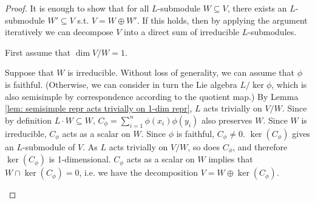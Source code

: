 \documentclass{article}
\begin{document}
\begin{proof}
    It is enough to show that for all $L$-submodule $W \subseteq V$, there exists an $L$-submodule $W' \subseteq V$ s.t. $V = W \oplus W'$. If this holds, then by applying the argument iteratively we can decompose $V$ into a direct sum of irreducible $L$-submodules.

     First assume that $\dim V/W = 1$. 
    \begin{addmargin}{2em}
         Suppose that $W$ is irreducible. Without loss of generality, we can assume that $\phi$ is faithful. (Otherwise, we can consider in turn the Lie algebra $L/\ker \phi$, which is also semisimple by correspondence according to the quotient map.) By Lemma \ref{lem: semisimple repr acts trivially on 1-dim repr}, $L$ acts trivially on $V/W$. Since by definition $L \cdot W \subseteq W$, $C_{\phi} = \sum_{i=1}^n \phi(x_i) \phi(y_i)$ also preserves $W$. Since $W$ is irreducible, $C_{\phi}$ acts as a scalar on $W$. Since $\phi$ is faithful, $C_{\phi} \neq 0$. $\ker (C_{\phi})$ gives an $L$-submodule of $V$. As $L$ acts trivially on $V/W$, so does $C_{\phi}$, and therefore $\ker(C_{\phi})$ is 1-dimensional. $C_{\phi}$ acts as a scalar on $W$ implies that $W \cap \ker(C_{\phi}) = 0$, i.e. we have the decomposition $V = W \oplus \ker(C_{\phi})$.
        

\end{addmargin}
\end{proof}
\end{document}
